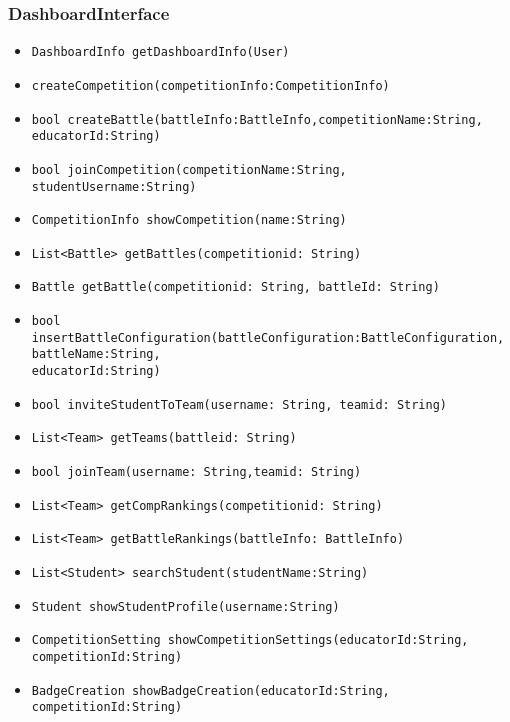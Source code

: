 \subsubsection{DashboardInterface}
\begin{itemize}
    \item \texttt{DashboardInfo getDashboardInfo(User)}%
    \item \texttt{createCompetition(competitionInfo:CompetitionInfo)}%
    \item \texttt{bool createBattle(battleInfo:BattleInfo,competitionName:String,\\educatorId:String)}%
    \item \texttt{bool joinCompetition(competitionName:String, studentUsername:String)}%
    \item \texttt{CompetitionInfo showCompetition(name:String)}%
    \item \texttt{List<Battle> getBattles(competitionid: String)}%
    \item \texttt{Battle getBattle(competitionid: String, battleId: String)}
    \item \texttt{bool insertBattleConfiguration(battleConfiguration:BattleConfiguration, battleName:String,\\educatorId:String)}%
    \item \texttt{bool inviteStudentToTeam(username: String, teamid: String)}%
    \item \texttt{List<Team> getTeams(battleid: String)}%
    \item \texttt{bool joinTeam(username: String,teamid: String)}%
    \item \texttt{List<Team> getCompRankings(competitionid: String)}
    \item \texttt{List<Team> getBattleRankings(battleInfo: BattleInfo)}
    \item \texttt{List<Student> searchStudent(studentName:String)}%
    \item \texttt{Student showStudentProfile(username:String)}%
    \item \texttt{CompetitionSetting showCompetitionSettings(educatorId:String,\\competitionId:String)}%
    \item \texttt{BadgeCreation showBadgeCreation(educatorId:String,\\competitionId:String)}%

\end{itemize}
